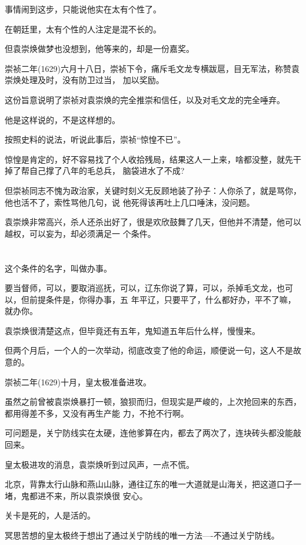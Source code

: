 \documentclass[11pt,a4paper,onecolumn]{article}
\begin{document}
事情闹到这步，只能说他实在太有个性了。

在朝廷里，太有个性的人注定是混不长的。

但袁崇焕做梦也没想到，他等来的，却是一份嘉奖。

崇祯二年(1629)六月十八日，崇祯下令，痛斥毛文龙专横跋扈，目无军法，称赞袁崇焕处理及时，没有防卫过当，
加以奖励。

这份旨意说明了崇祯对袁崇焕的完全推崇和信任，以及对毛文龙的完全唾弃。

他是这样说的，不是这样想的。

按照史料的说法，听说此事后，崇祯``惊惶不已''。

惊惶是肯定的，好不容易找了个人收拾残局，结果这人一上来，啥都没整，就先干掉了帮自己撑了八年的毛总兵，
脑袋进水了不成?

但崇祯同志不愧为政治家，关键时刻义无反顾地装了孙子：人你杀了，就是骂你，他也活不了，索性骂他几句，说
他死得该再吐上几口唾沫，没问题。

袁崇焕非常高兴，杀人还杀出好了，很是欢欣鼓舞了几天，但他并不清楚，他可以越权，可以妄为，却必须满足一
个条件。

\section[\thesection]{}

这个条件的名字，叫做办事。

要当督师，可以，要取消巡抚，可以，辽东你说了算，可以，杀掉毛文龙，也可以，但前提条件是，你得办事，五
年平辽，只要平了，什么都好办，平不了嘛，就办你。

袁崇焕很清楚这点，但毕竟还有五年，鬼知道五年后什么样，慢慢来。

但两个月后，一个人的一次举动，彻底改变了他的命运，顺便说一句，这人不是故意的。

崇祯二年(1629)十月，皇太极准备进攻。

虽然之前曾被袁崇焕暴打一顿，狼狈而归，但现实是严峻的，上次抢回来的东西，都用得差不多，又没有再生产能
力，不抢不行啊。

可问题是，关宁防线实在太硬，连他爹算在内，都去了两次了，连块砖头都没能敲回来。

皇太极进攻的消息，袁崇焕听到过风声，一点不慌。

北京，背靠太行山脉和燕山山脉，通往辽东的唯一大道就是山海关，把这道口子一堵，鬼都进不来，所以袁崇焕很
安心。

关卡是死的，人是活的。

冥思苦想的皇太极终于想出了通过关宁防线的唯一方法----不通过关宁防线。
\end{document}

